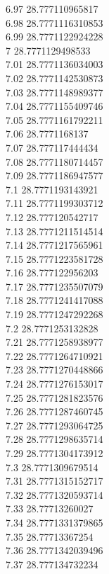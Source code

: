{6.97	28.777110965817\\
6.98	28.7771116310853\\
6.99	28.7771122924228\\
7	28.7771129498533\\
7.01	28.7771136034003\\
7.02	28.7771142530873\\
7.03	28.7771148989377\\
7.04	28.7771155409746\\
7.05	28.7771161792211\\
7.06	28.7771168137\\
7.07	28.777117444434\\
7.08	28.7771180714457\\
7.09	28.7771186947577\\
7.1	28.7771193143921\\
7.11	28.7771199303712\\
7.12	28.777120542717\\
7.13	28.7771211514514\\
7.14	28.7771217565961\\
7.15	28.7771223581728\\
7.16	28.777122956203\\
7.17	28.7771235507079\\
7.18	28.7771241417088\\
7.19	28.7771247292268\\
7.2	28.7771253132828\\
7.21	28.7771258938977\\
7.22	28.7771264710921\\
7.23	28.7771270448866\\
7.24	28.7771276153017\\
7.25	28.7771281823576\\
7.26	28.7771287460745\\
7.27	28.7771293064725\\
7.28	28.7771298635714\\
7.29	28.7771304173912\\
7.3	28.7771309679514\\
7.31	28.7771315152717\\
7.32	28.7771320593714\\
7.33	28.77713260027\\
7.34	28.7771331379865\\
7.35	28.77713367254\\
7.36	28.7771342039496\\
7.37	28.777134732234\\
}
